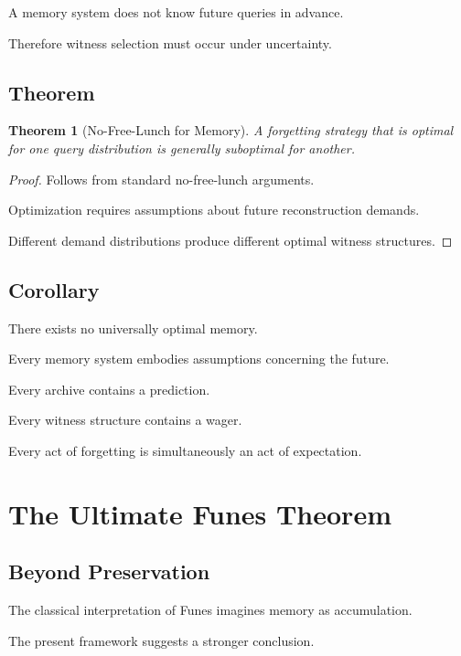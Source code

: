 \documentclass[12pt,oneside]{book}
\theoremstyle{plain} \newtheorem{theorem}{Theorem}[chapter] \newtheorem{lemma}[theorem]{Lemma} \newtheorem{proposition}[theorem]{Proposition} \newtheorem{corollary}[theorem]{Corollary}
\theoremstyle{definition} \newtheorem{definition}[theorem]{Definition} \newtheorem{axiom}[theorem]{Axiom} \newtheorem{construction}[theorem]{Construction}
\theoremstyle{remark} \newtheorem{remark}[theorem]{Remark} \newtheorem{example}[theorem]{Example}
\begin{document}
A memory system does not know future queries in advance.

Therefore witness selection must occur under uncertainty.

\section{Theorem}

\begin{theorem}[No-Free-Lunch for Memory]

A forgetting strategy that is optimal for one query distribution is generally suboptimal for another.

\end{theorem}

\begin{proof}

Follows from standard no-free-lunch arguments.

Optimization requires assumptions about future reconstruction demands.

Different demand distributions produce different optimal witness structures.

\end{proof}

\section{Corollary}

There exists no universally optimal memory.

Every memory system embodies assumptions concerning the future.

Every archive contains a prediction.

Every witness structure contains a wager.

Every act of forgetting is simultaneously an act of expectation.

\chapter{The Ultimate Funes Theorem}

\section{Beyond Preservation}

The classical interpretation of Funes imagines memory as accumulation.

The present framework suggests a stronger conclusion.
\end{document}
